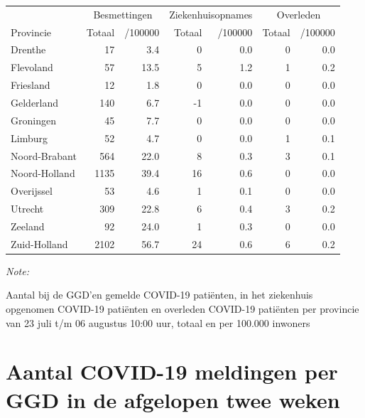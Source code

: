 \documentclass[
  english,
  man,floatsintext]{apa6}
\begin{document}
\begin{table}[H]
\centering
\begin{threeparttable}
\begin{tabular}{lrrrrrr}
\toprule
\multicolumn{1}{c}{ } & \multicolumn{2}{c}{Besmettingen} & \multicolumn{2}{c}{Ziekenhuisopnames} & \multicolumn{2}{c}{Overleden} \\
\cmidrule(l{3pt}r{3pt}){2-3} \cmidrule(l{3pt}r{3pt}){4-5} \cmidrule(l{3pt}r{3pt}){6-7}
Provincie & Totaal & /100000 & Totaal & /100000 & Totaal & /100000\\
\midrule
Drenthe & 17 & 3.4 & 0 & 0.0 & 0 & 0.0\\
Flevoland & 57 & 13.5 & 5 & 1.2 & 1 & 0.2\\
Friesland & 12 & 1.8 & 0 & 0.0 & 0 & 0.0\\
Gelderland & 140 & 6.7 & -1 & 0.0 & 0 & 0.0\\
Groningen & 45 & 7.7 & 0 & 0.0 & 0 & 0.0\\
Limburg & 52 & 4.7 & 0 & 0.0 & 1 & 0.1\\
Noord-Brabant & 564 & 22.0 & 8 & 0.3 & 3 & 0.1\\
Noord-Holland & 1135 & 39.4 & 16 & 0.6 & 0 & 0.0\\
Overijssel & 53 & 4.6 & 1 & 0.1 & 0 & 0.0\\
Utrecht & 309 & 22.8 & 6 & 0.4 & 3 & 0.2\\
Zeeland & 92 & 24.0 & 1 & 0.3 & 0 & 0.0\\
Zuid-Holland & 2102 & 56.7 & 24 & 0.6 & 6 & 0.2\\
\bottomrule
\end{tabular}
\begin{tablenotes}
\item \textit{Note: } 
\item Aantal bij de GGD’en gemelde COVID-19 patiënten, in het ziekenhuis opgenomen COVID-19 patiënten en overleden COVID-19 patiënten per provincie van 23 juli t/m 06 augustus 10:00 uur, totaal en per 100.000 inwoners
\end{tablenotes}
\end{threeparttable}
\end{table}

\newpage

\hypertarget{aantal-covid-19-meldingen-per-ggd-in-de-afgelopen-twee-weken}{%
\section{Aantal COVID-19 meldingen per GGD in de afgelopen twee weken}\label{aantal-covid-19-meldingen-per-ggd-in-de-afgelopen-twee-weken}}
\end{document}
